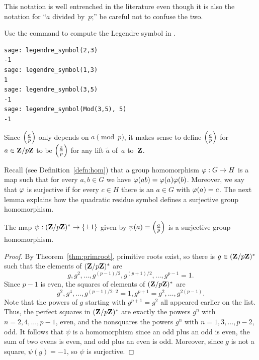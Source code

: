 This notation is well entrenched in the literature even though it
is also the notation for ``$a$ divided by~$p$;'' be careful
not to confuse the two.

\begin{sg}
Use the  command to
compute the Legendre symbol in \sage.
\begin{verbatim}
sage: legendre_symbol(2,3)
-1
sage: legendre_symbol(1,3)
1
sage: legendre_symbol(3,5)
-1
sage: legendre_symbol(Mod(3,5), 5)
-1
\end{verbatim}
\end{sg}

Since $\left(\frac{a}{p}\right)$ only depends on $a\pmod{p}$, it makes sense
to define $\left(\frac{a}{p}\right)$ for $a\in \mathbf{Z}/p\mathbf{Z}{}$ to be $\left(\frac{\tilde{a}}{p}\right)$ for
any lift $\tilde{a}$ of~$a$ to~$\mathbf{Z}$.

Recall (see Definition~\ref{defn:hom}) that a group
homomorphism $\varphi:G \to H$ is a map such that for every
$a,b\in G$ we have $\varphi(ab) = \varphi(a)\varphi(b)$.
Moreover, we say that $\varphi$ is surjective if for every
$c\in H$ there is an $a\in G$ with $\varphi(a) = c$.
The next lemma explains how the quadratic
residue symbol defines a surjective group homomorphism.

\begin{lemma}\label{lem:qrhom}
  The map $\psi:(\mathbf{Z}/p\mathbf{Z}{})^*\to \{\pm 1\}$ given by
$\psi(a) = \left(\frac{a}{p}\right)$ is a surjective group homomorphism.
\end{lemma}
\begin{proof}
  By Theorem~\ref{thm:primroot}, primitive roots exist, so
there is $g\in (\mathbf{Z}/p\mathbf{Z}{})^*$ such that the elements of $(\mathbf{Z}/p\mathbf{Z}{})^*$ are
$$
  g, g^2, \ldots, g^{(p-1)/2}, g^{(p+1)/2}, \ldots, g^{p-1}=1.
$$
Since $p-1$ is even, the squares of elements of $(\mathbf{Z}/p\mathbf{Z}{})^*$ are
$$
  g^2, g^4, \ldots, g^{(p-1)/2 \cdot 2}=1, g^{p+1}=g^2,\ldots, g^{2(p-1)}.
$$
Note that the powers of $g$ starting with $g^{p+1}=g^2$ all appeared
earlier on the list.  Thus, the perfect squares in $(\mathbf{Z}/p\mathbf{Z}{})^*$ are
exactly the powers $g^n$ with $n=2,4,\ldots,p-1$, even, and the
nonsquares the powers $g^n$ with $n=1,3,\ldots,p-2$, odd.  It follows
that $\psi$ is a homomorphism since an odd plus an odd is even, the
sum of two evens is even, and odd plus an even is odd. Moreover,
since $g$ is not a square, $\psi(g)=-1$, so $\psi$ is surjective.

\end{proof}

